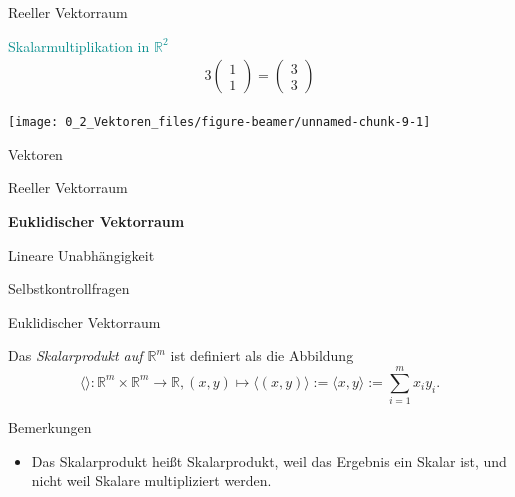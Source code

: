 \documentclass[
  8pt,
  ignorenonframetext,
]{beamer}
\providecommand{\tightlist}{%
  \setlength{\itemsep}{0pt}\setlength{\parskip}{0pt}}
\begin{document}
\begin{frame}{Reeller Vektorraum}
\protect\hypertarget{reeller-vektorraum-8}{}
\vspace{3mm}

\textcolor{darkcyan}{Skalarmultiplikation in $\mathbb{R}^2$}
\vspace{9pt} \small \begin{align*}
3
\begin{pmatrix}
1 \\ 1
\end{pmatrix}
=
\begin{pmatrix}
3 \\ 3
\end{pmatrix}
\end{align*}

\begin{center}\texttt{[image: 0\_2\_Vektoren\_files/figure-beamer/unnamed-chunk-9-1]} \end{center}
\end{frame}

\begin{frame}{Vektoren}
\protect\hypertarget{vektoren-3}{}
\vspace{3mm}
\vfill
{}
\Large

Reeller Vektorraum

\textbf{Euklidischer Vektorraum}

Lineare Unabhängigkeit

Selbstkontrollfragen
\end{frame}

\begin{frame}{Euklidischer Vektorraum}
\protect\hypertarget{euklidischer-vektorraum}{}
\vspace{3mm}
\justifying
{}

\begin{definition}
\footnotesize
Das \textit{Skalarprodukt auf $\mathbb{R}^m$} ist definiert als die Abbildung
\begin{equation}
\langle \rangle : \mathbb{R}^m \times \mathbb{R}^m \to \mathbb{R}, (x,y) \mapsto \langle (x,y) \rangle := \langle x,y \rangle := \sum^m_{i=1}x_iy_i.
\end{equation}
\end{definition}

\small

Bemerkungen

\begin{itemize}
\tightlist
\item
  Das Skalarprodukt heißt Skalarprodukt, weil das Ergebnis ein Skalar
  ist, und nicht weil Skalare multipliziert werden.
\end{itemize}
\end{frame}
\end{document}
